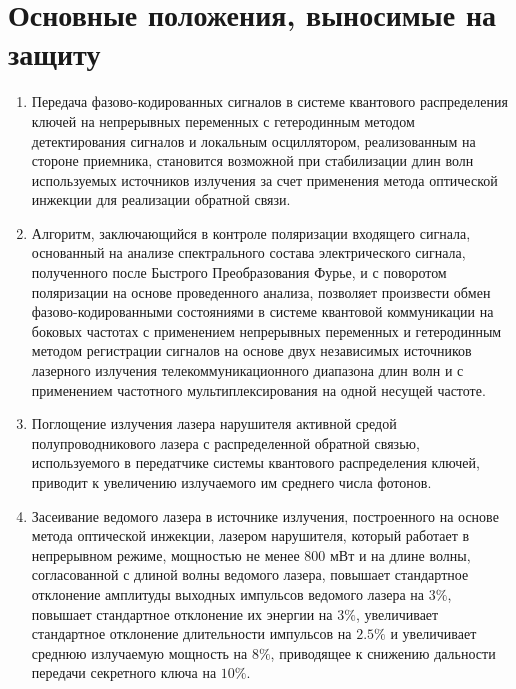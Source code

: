 \section*{Основные положения, выносимые на защиту}
\begin{enumerate}
    \item Передача фазово-кодированных сигналов в системе квантового распределения ключей на непрерывных переменных с гетеродинным методом детектирования сигналов и локальным осциллятором, реализованным на стороне приемника, становится возможной при стабилизации длин волн используемых источников излучения за счет применения метода оптической инжекции для реализации обратной связи.
    \item Алгоритм, заключающийся в контроле поляризации входящего сигнала,  основанный на анализе спектрального состава электрического сигнала, полученного после Быстрого Преобразования Фурье, и с поворотом поляризации на основе проведенного анализа, позволяет произвести обмен фазово-кодированными состояниями в системе квантовой коммуникации на боковых частотах с применением непрерывных переменных и гетеродинным методом регистрации сигналов на основе двух независимых источников лазерного  излучения телекоммуникационного диапазона длин волн  и с применением частотного мультиплексирования на одной несущей частоте. 
    \item Поглощение излучения лазера нарушителя  активной средой полупроводникового лазера с распределенной обратной связью, используемого в передатчике системы квантового распределения ключей, приводит к увеличению излучаемого им среднего числа фотонов.
    \item Засеивание ведомого лазера в источнике излучения, построенного  на основе метода оптической инжекции, лазером нарушителя, который работает в непрерывном режиме, мощностью не менее 800 мВт и на длине волны, согласованной с длиной волны ведомого лазера,  повышает стандартное отклонение амплитуды выходных импульсов ведомого лазера на $3\%$, повышает стандартное отклонение их энергии на $3\%$, увеличивает стандартное отклонение длительности импульсов на $2.5\%$ и увеличивает среднюю излучаемую мощность на $8\%$, приводящее к снижению дальности передачи секретного ключа на $10\%$.
\end{enumerate}
